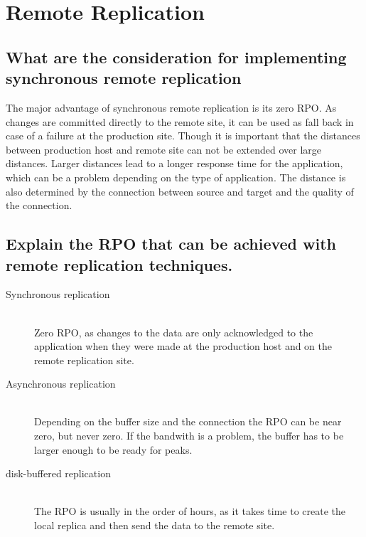 \section{Remote Replication} %
\label{sec:remote_replication}

\subsection{What are the consideration for implementing synchronous remote replication} %
\label{sub:what_are_the_consideration_for_implementing_synchronous_remote_replication}
	The major advantage of synchronous remote replication is its zero RPO.
	As changes are committed directly to the remote site,
	it can be used as fall back in case of a failure at the production site.
	Though it is important that the distances between production host
	and remote site can not be extended over large distances.
	Larger distances lead to a longer response time for the application,
	which can be a problem depending on the type of application.
	The distance is also determined by the connection between source and target
	and the quality of the connection.

\subsection{Explain the RPO that can be achieved with remote replication techniques.} %
\label{sub:explain_the_rpo_that_can_be_achieved_with_remote_replication_techniques}

	\begin{description}
		\item[Synchronous replication] \hfill \\
			Zero RPO, as changes to the data are only acknowledged to
			the application when they were made at the production host
			and on the remote replication site.
		\item[Asynchronous replication] \hfill \\
			Depending on the buffer size and the connection the RPO can be near zero,
			but never zero.
			If the bandwith is a problem,
			the buffer has to be larger enough to be ready for peaks.
		\item[disk-buffered replication] \hfill \\
			The RPO is usually in the order of hours,
			as it takes time to create the local replica
			and then send the data to the remote site.
	\end{description}

